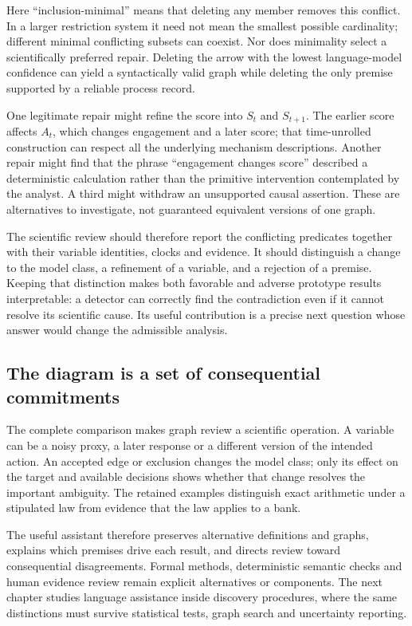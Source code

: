 Here ``inclusion-minimal'' means that deleting any member removes this
conflict. In a larger restriction system it need not mean the smallest
possible cardinality; different minimal conflicting subsets can coexist.
Nor does minimality select a scientifically preferred repair. Deleting
the arrow with the lowest language-model confidence can yield a
syntactically valid graph while deleting the only premise supported by a
reliable process record.

One legitimate repair might refine the score into \(S_t\) and
\(S_{t+1}\). The earlier score affects \(A_t\), which changes engagement
and a later score; that time-unrolled construction can respect all the
underlying mechanism descriptions. Another repair might find that the
phrase ``engagement changes score'' described a deterministic
calculation rather than the primitive intervention contemplated by the
analyst. A third might withdraw an unsupported causal assertion. These
are alternatives to investigate, not guaranteed equivalent versions of
one graph.

The scientific review should therefore report the conflicting predicates
together with their variable identities, clocks and evidence. It should
distinguish a change to the model class, a refinement of a variable, and
a rejection of a premise. Keeping that distinction makes both favorable
and adverse prototype results interpretable: a detector can correctly
find the contradiction even if it cannot resolve its scientific cause.
Its useful contribution is a precise next question whose answer would
change the admissible analysis.

\subsection{The diagram is a set of consequential commitments}

The complete comparison makes graph review a scientific operation. A variable
can be a noisy proxy, a later response or a different version of the intended
action. An accepted edge or exclusion changes the model class; only its effect
on the target and available decisions shows whether that change resolves the
important ambiguity. The retained examples distinguish exact arithmetic under
a stipulated law from evidence that the law applies to a bank.

The useful assistant therefore preserves alternative definitions and graphs,
explains which premises drive each result, and directs review toward
consequential disagreements. Formal methods, deterministic semantic checks and
human evidence review remain explicit alternatives or components. The next
chapter studies language assistance inside discovery procedures, where the
same distinctions must survive statistical tests, graph search and uncertainty
reporting.
\label{exec13:restriction-development-end}


